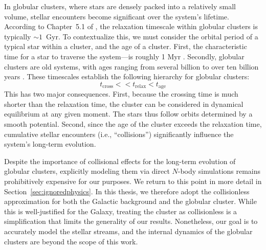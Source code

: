     In globular clusters, where stars are densely packed into a relatively small volume, stellar encounters become significant over the system's lifetime. According to Chapter~5.1 of \citet{bovy_inprep}, the relaxation timescale within globular clusters is typically $\sim1$~Gyr. To contextualize this, we must consider the orbital period of a typical star within a cluster, and the age of a cluster. First, the characteristic time for a star to traverse the system—is roughly 1 Myr \citep[which can be estimated as the size of a system divided by its internal velocity dispersion][]{2018MNRAS.478.1520B}. Secondly, globular clusters are old systems, with ages ranging from several billion to over ten billion years \citep{2013ApJ...775..134V}. These timescales establish the following hierarchy for globular clusters:
    \begin{equation*}
        t_\mathrm{cross} << t_\mathrm{relax} < t_\mathrm{age}
    \end{equation*}
    This has two major consequences. First, because the crossing time is much shorter than the relaxation time, the cluster can be considered in dynamical equilibrium at any given moment. The stars thus follow orbits determined by a smooth potential. Second, since the age of the cluster exceeds the relaxation time, cumulative stellar encounters (i.e., ``collisions'') significantly influence the system's long-term evolution.

    Despite the importance of collisional effects for the long-term evolution of globular clusters, explicitly modeling them via direct $N$-body simulations remains prohibitively expensive for our purposes. We return to this point in more detail in Section~\ref{sec:ignoredphysics}. In this thesis, we therefore adopt the collisionless approximation for both the Galactic background and the globular cluster. While this is well-justified for the Galaxy, treating the cluster as collisionless is a simplification that limits the generality of our results. Nonetheless, our goal is to accurately model the stellar streams, and the internal dynamics of the globular clusters are beyond the scope of this work.

